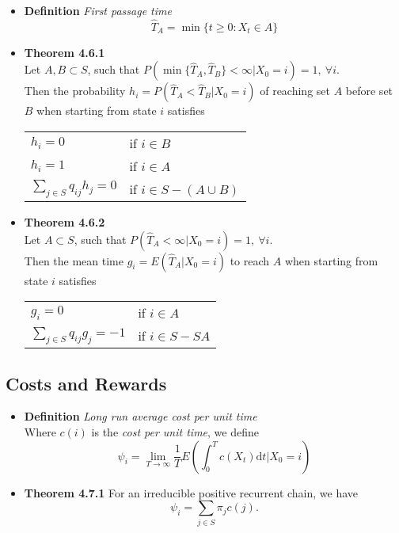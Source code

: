 \documentclass[11pt,a4paper]{article}
\begin{document}
\begin{itemize}
    \item \textbf{Definition} \emph{First passage time} \\
        \[
            \widehat{T}_A = \min \{t \geq 0 : X_t \in A \}
        \]

    \item \textbf{Theorem 4.6.1} \\
        Let $A, B \subset S$, such that
        $P(\min \{\widehat{T}_A, \widehat{T}_B\} < \infty | X_0 = i) = 1, \ \forall i$. \\
        Then the probability $h_i = P(\widehat{T}_A < \widehat{T}_B | X_0 = i)$
        of reaching set $A$ before set $B$ when starting from state $i$ satisfies

        \begin{center}{}
            \begin{tabular}{l l}
                $h_i = 0$                       & if $i \in B$ \\
                $h_i = 1$                       & if $i \in A$ \\
                $\sum_{j \in S} q_{ij} h_j = 0$ & if $i \in S - (A \cup B)$
            \end{tabular}
        \end{center}

    \item \textbf{Theorem 4.6.2} \\
        Let $A \subset S$, such that $P(\widehat{T}_A < \infty | X_0 = i) = 1, \ \forall i$. \\
        Then the mean time $g_i = E(\widehat{T}_A | X_0 = i)$ to reach $A$ when starting from state
        $i$ satisfies

        \begin{center}{}
            \begin{tabular}{l l}
                $g_i = 0$                        & if $i \in A$ \\
                $\sum_{j \in S} q_{ij} g_j = -1$ & if $i \in S -S A$
            \end{tabular}
        \end{center}

\end{itemize}

\subsection{Costs and Rewards}

\begin{itemize}

    \item \textbf{Definition} \emph{Long run average cost per unit time} \\
        Where $c(i)$ is the \emph{cost per unit time}, we define
        \[
            \psi_i = \lim_{T \to \infty} \frac{1}{T} E
            \left(\int_0^T c(X_t) \mathrm{d}t | X_0 = i\right)
        \]

    \item \textbf{Theorem 4.7.1}
        For an irreducible positive recurrent chain, we have
        \[
            \psi_i = \sum_{j \in S} \pi_j c(j).
        \]
\end{itemize}
\end{document}
